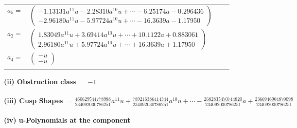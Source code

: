 \documentclass[1p]{elsarticle_modified}
\theoremstyle{definition}
\begin{document}
\begin{tabular}{m{7pt} m{180pt} m{7pt} m{180pt} }
\flushright $a_{5}=$&$\begin{pmatrix}-1.13131 a^{11} u-2.28310 a^{10} u+\cdots-6.25174 a-0.296436\\-2.96180 a^{11} u-5.97724 a^{10} u+\cdots-16.3639 a-1.17950\end{pmatrix}$ \\
\flushright $a_{2}=$&$\begin{pmatrix}1.83049 a^{11} u+3.69414 a^{10} u+\cdots+10.1122 a+0.883061\\2.96180 a^{11} u+5.97724 a^{10} u+\cdots+16.3639 a+1.17950\end{pmatrix}$ \\
\flushright $a_{4}=$&$\begin{pmatrix}- u\\- u\end{pmatrix}$\\&\end{tabular}
\flushleft \textbf{(ii) Obstruction class $= -1$}\\~\\
\flushleft \textbf{(iii) Cusp Shapes $= \frac{460629544778988}{234092030786251} a^{11} u+\frac{789216386414344}{234092030786251} a^{10} u+\cdots-\frac{2682835470744820}{234092030786251} a+\frac{2366946904870098}{234092030786251}$}\\~\\
\newpage\renewcommand{\arraystretch}{1}
\flushleft \textbf{(iv) u-Polynomials at the component}\newline \\
\end{document}
